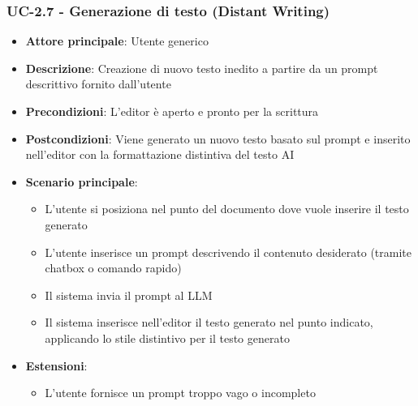 \documentclass[11pt,a4paper]{article}
\begin{document}
\subsubsection{UC-2.7 - Generazione di testo (Distant Writing)}
\begin{itemize}
    \item \textbf{Attore principale}: Utente generico
    \item \textbf{Descrizione}: Creazione di nuovo testo inedito a partire da un prompt descrittivo fornito dall’utente
    \item \textbf{Precondizioni}: L’editor è aperto e pronto per la scrittura
    \item \textbf{Postcondizioni}: Viene generato un nuovo testo basato sul prompt e inserito nell’editor con la formattazione distintiva del testo AI
    \item \textbf{Scenario principale}:
    \begin{itemize}
        \item L’utente si posiziona nel punto del documento dove vuole inserire il testo generato
        \item L’utente inserisce un prompt descrivendo il contenuto desiderato (tramite chatbox o comando rapido)
        \item Il sistema invia il prompt al LLM
        \item Il sistema inserisce nell'editor il testo generato nel punto indicato, applicando lo stile distintivo per il testo generato
    \end{itemize}
    \item \textbf{Estensioni}:
    \begin{itemize}
        \item L’utente fornisce un prompt troppo vago o incompleto
    \end{itemize}
\end{itemize}
\end{document}
